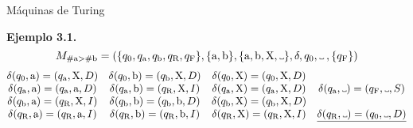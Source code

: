 \documentclass[10pt,xcolor=dvipsnames,aspectratio=169,spanish]{beamer}
\newcommand\Vtextvisiblespace[1][.3em]{%
\mbox{\kern.06em\vrule height.3ex}%
\vbox{\hrule width#1}%
\hbox{\vrule height.3ex}}
\begin{document}
\begin{frame}{Máquinas de Turing}

\textbf{Ejemplo 3.1}\textbf{.}
$$
    M_{\#\text{a}>\#\text{b}}=(\{q_0, q_\text{a}, q_\text{b}, q_\text{R}, q_\text{F}\}, \{\text{a}, \text{b}\}, \{\text{a}, \text{b}, \text{X}, \Vtextvisiblespace\}, \delta, q_0, \Vtextvisiblespace\:,\{q_\text{F}\})
$$
$$
    \begin{matrix}
        \delta(q_0, \text{a}) = (q_\text{a},\text{X},D) & \delta(q_0, \text{b}) = (q_\text{b},\text{X},D) & \delta(q_0, \text{X}) = (q_0,\text{X},D) &  \\
        \delta(q_\text{a}, \text{a}) = (q_\text{a},\text{a},D) & \delta(q_\text{a}, \text{b}) = (q_\text{R},\text{X},I) & \delta(q_\text{a}, \text{X}) = (q_\text{a},\text{X},D) & \delta(q_\text{a}, \Vtextvisiblespace) = (q_\text{F},\Vtextvisiblespace,S) \\
        \delta(q_\text{b}, \text{a}) = (q_\text{R},\text{X},I) & \delta(q_\text{b}, \text{b}) = (q_\text{b},\text{b},D) & \delta(q_\text{b}, \text{X}) = (q_\text{b},\text{X},D) &  \\
        \delta(q_\text{R}, \text{a}) = (q_\text{R},\text{a},I) & \delta(q_\text{R}, \text{b}) = (q_\text{R},\text{b},I) & \delta(q_\text{R}, \text{X}) = (q_\text{R},\text{X},I) & \underline{\delta(q_\text{R}, \Vtextvisiblespace) = (q_0,\Vtextvisiblespace,D)} \\
    \end{matrix}
$$

\vspace{5mm}

\begin{adjustbox}{max height={.67\textheight},center}

\end{adjustbox}

\end{frame}
\end{document}
